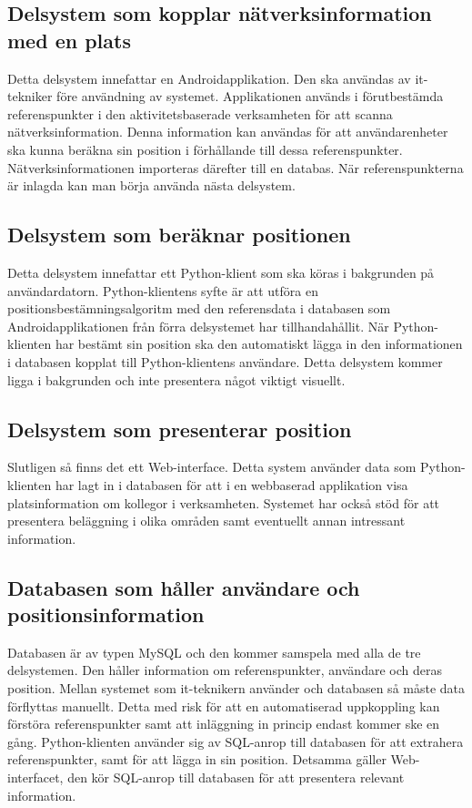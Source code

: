 \documentclass[swedish, a4paper,12pt]{article}
\begin{document}
\subsection{Delsystem som kopplar nätverksinformation med en plats}
Detta delsystem innefattar en Androidapplikation. Den ska användas av it-tekniker före användning av systemet. Applikationen används i förutbestämda referenspunkter i den aktivitetsbaserade verksamheten för att scanna nätverksinformation. Denna information kan användas för att användarenheter ska kunna beräkna sin position i förhållande till  dessa referenspunkter.  Nätverksinformationen importeras därefter till en databas. När referenspunkterna är inlagda kan man börja använda nästa delsystem.

\subsection{Delsystem som beräknar positionen}
Detta delsystem innefattar ett Python-klient som ska köras i bakgrunden på användardatorn.
Python-klientens syfte är att utföra en positionsbestämningsalgoritm med den referensdata i databasen som Androidapplikationen från förra delsystemet har tillhandahållit. När Python-klienten har bestämt sin position ska den automatiskt lägga in den informationen i databasen kopplat till Python-klientens användare. Detta delsystem kommer ligga i bakgrunden och inte presentera något viktigt visuellt.

\subsection{Delsystem som presenterar position}
Slutligen så finns det ett Web-interface. Detta system använder data som Python-klienten har lagt in i databasen för att i en webbaserad applikation visa platsinformation om kollegor i verksamheten. Systemet har också stöd för att presentera beläggning i olika områden samt eventuellt annan intressant information.

\subsection{Databasen som håller användare och positionsinformation}
Databasen är av typen MySQL och den kommer samspela med alla de tre delsystemen. Den håller information om referenspunkter, användare och deras position.
Mellan systemet som it-teknikern använder och databasen så måste data förflyttas manuellt. Detta med risk för att en automatiserad uppkoppling kan förstöra referenspunkter samt att inläggning in princip endast kommer ske en gång. Python-klienten använder sig av SQL-anrop till databasen för att extrahera referenspunkter, samt för att lägga in sin position. Detsamma gäller Web-interfacet, den kör SQL-anrop till databasen för att presentera relevant information.
\end{document}
